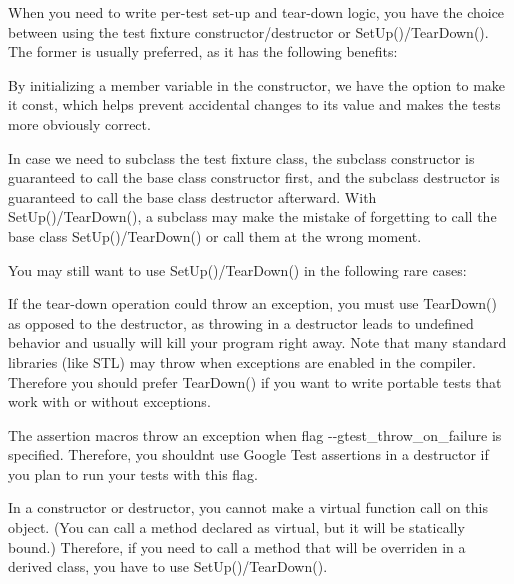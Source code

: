 When you need to write per-\/test set-\/up and tear-\/down logic, you have the choice between using the test fixture constructor/destructor or {\ttfamily Set\+Up()/\+Tear\+Down()}. The former is usually preferred, as it has the following benefits\+:


\begin{DoxyItemize}
\item By initializing a member variable in the constructor, we have the option to make it {\ttfamily const}, which helps prevent accidental changes to its value and makes the tests more obviously correct.
\item In case we need to subclass the test fixture class, the subclass\textquotesingle{} constructor is guaranteed to call the base class\textquotesingle{} constructor first, and the subclass\textquotesingle{} destructor is guaranteed to call the base class\textquotesingle{} destructor afterward. With {\ttfamily Set\+Up()/\+Tear\+Down()}, a subclass may make the mistake of forgetting to call the base class\textquotesingle{} {\ttfamily Set\+Up()/\+Tear\+Down()} or call them at the wrong moment.
\end{DoxyItemize}

You may still want to use {\ttfamily Set\+Up()/\+Tear\+Down()} in the following rare cases\+:
\begin{DoxyItemize}
\item If the tear-\/down operation could throw an exception, you must use {\ttfamily Tear\+Down()} as opposed to the destructor, as throwing in a destructor leads to undefined behavior and usually will kill your program right away. Note that many standard libraries (like S\+TL) may throw when exceptions are enabled in the compiler. Therefore you should prefer {\ttfamily Tear\+Down()} if you want to write portable tests that work with or without exceptions.
\item The assertion macros throw an exception when flag {\ttfamily -\/-\/gtest\+\_\+throw\+\_\+on\+\_\+failure} is specified. Therefore, you shouldn\textquotesingle{}t use Google Test assertions in a destructor if you plan to run your tests with this flag.
\item In a constructor or destructor, you cannot make a virtual function call on this object. (You can call a method declared as virtual, but it will be statically bound.) Therefore, if you need to call a method that will be overriden in a derived class, you have to use {\ttfamily Set\+Up()/\+Tear\+Down()}.
\end{DoxyItemize}

